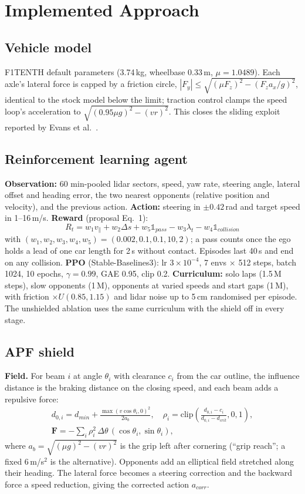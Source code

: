 \documentclass[conference]{IEEEtran}
\begin{document}
\section{Implemented Approach}
\subsection{Vehicle model}
F1TENTH default parameters (3.74\,kg, wheelbase 0.33\,m, $\mu = 1.0489$). Each axle's lateral force is capped by a
friction circle, $|F_y| \le \sqrt{(\mu F_z)^2 - (F_z a_x/g)^2}$, identical to the stock model below the limit;
traction control clamps the speed loop's acceleration to $\sqrt{(0.95\mu g)^2 - (v r)^2}$. This closes the
sliding exploit reported by Evans et al.~\cite{evans2023}.

\subsection{Reinforcement learning agent}
\textbf{Observation:} 60 min-pooled lidar sectors, speed, yaw rate, steering angle, lateral offset and heading
error, the two nearest opponents (relative position and velocity), and the previous action.
\textbf{Action:} steering in $\pm0.42$\,rad and target speed in 1--16\,m/s. \textbf{Reward} (proposal Eq.~1):
\begin{equation}
R_t = w_1 v_\parallel + w_2 \Delta s + w_5 \mathbb{1}_{pass} - w_3 \lambda_t - w_4 \mathbb{1}_{collision}
\end{equation}
with $(w_1,w_2,w_3,w_4,w_5) = (0.002, 0.1, 0.1, 10, 2)$; a pass counts once the ego holds a lead of one car
length for 2\,s without contact. Episodes last 40\,s and end on any collision.
\textbf{PPO} (Stable-Baselines3): lr $3\!\times\!10^{-4}$, 7 envs $\times$ 512 steps, batch 1024, 10 epochs,
$\gamma = 0.99$, GAE 0.95, clip 0.2. \textbf{Curriculum:} solo laps (1.5\,M steps), slow opponents (1\,M),
opponents at varied speeds and start gaps (1\,M), with friction $\times U(0.85, 1.15)$ and lidar noise up to
5\,cm randomised per episode. The unshielded ablation uses the same curriculum with the shield off in every stage.

\subsection{APF shield}
\textbf{Field.} For beam $i$ at angle $\theta_i$ with clearance $c_i$ from the car outline, the influence distance
is the braking distance on the closing speed, and each beam adds a repulsive force:
\begin{gather}
d_{0,i} = d_{min} + \frac{\max(v\cos\theta_i, 0)^2}{2 a_b}, \quad
\rho_i = \mathrm{clip}\!\left(\frac{d_{0,i} - c_i}{d_{0,i} - d_{crit}}, 0, 1\right),\\
\mathbf{F} = -\textstyle\sum_i \rho_i^2\, \Delta\theta \,(\cos\theta_i, \sin\theta_i),
\end{gather}
where $a_b = \sqrt{(\mu g)^2 - (v r)^2}$ is the grip left after cornering (``grip reach''; a fixed 6\,m/s$^2$
is the alternative). Opponents add an elliptical field stretched along their heading. The lateral force becomes a
steering correction and the backward force a speed reduction, giving the corrected action $a_{corr}$.
\end{document}
